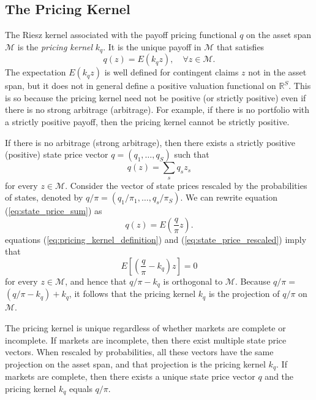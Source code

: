 \documentclass[\topdir/lecture\_notes.tex]{subfiles}
\begin{document}
\subsection{The Pricing Kernel}
The Riesz kernel associated with the payoff pricing functional $q$ on the asset span $\mathcal{M}$ is the \emph{pricing kernel} $k_{q}$. It is the unique payoff in $\mathcal{M}$ that satisfies
\begin{equation}
q(z)=E(k_{q} z), \quad \forall z \in \mathcal{M}. \label{eq:pricing_kernel_definition} 
\end{equation}
The expectation $E(k_{q} z)$ is well defined for contingent claims $z$ not in the asset span, but it does not in general define a positive valuation functional on $\mathbb{R}^{S}$. This is so because the pricing kernel need not be positive (or strictly positive) even if there is no strong arbitrage (arbitrage). For example, if there is no portfolio with a strictly positive payoff, then the pricing kernel cannot be strictly positive.

If there is no arbitrage (strong arbitrage), then there exists a strictly positive (positive) state price vector $q=(q_{1}, \ldots, q_{S})$ such that
\begin{equation}
q(z)=\sum_{s} q_{s} z_{s} \label{eq:state_price_sum}
\end{equation}
for every $z \in \mathcal{M}$. Consider the vector of state prices rescaled by the probabilities of states, denoted by $q / \pi=(q_{1} / \pi_{1}, \ldots, q_{s} / \pi_{S})$. We can rewrite equation (\ref{eq:state_price_sum}) as
\begin{equation}
q(z)=E(\frac{q}{\pi} z). \label{eq:state_price_rescaled}
\end{equation}
equations (\ref{eq:pricing_kernel_definition}) and (\ref{eq:state_price_rescaled}) imply that
\begin{equation}
E\left[(\frac{q}{\pi}-k_{q}) z\right]=0 \label{eq:orthogonality_condition}
\end{equation}
for every $z \in \mathcal{M}$, and hence that $q / \pi-k_{q}$ is orthogonal to $\mathcal{M}$. Because $q / \pi=$ $\left(q / \pi-k_{q}\right)+k_{q}$, it follows that the pricing kernel $k_{q}$ is the projection of $q / \pi$ on $\mathcal{M}$.

The pricing kernel is unique regardless of whether markets are complete or incomplete. If markets are incomplete, then there exist multiple state price vectors. When rescaled by probabilities, all these vectors have the same projection on the asset span, and that projection is the pricing kernel $k_{q}$. If markets are complete, then there exists a unique state price vector $q$ and the pricing kernel $k_{q}$ equals $q / \pi$.
\end{document}

